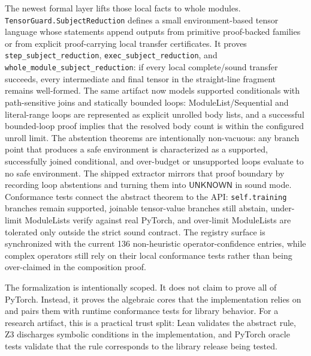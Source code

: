 \documentclass[11pt]{article}
\newcommand{\unknown}{\ensuremath{\mathsf{UNKNOWN}}}
\begin{document}
The newest formal layer lifts those local facts to whole modules.
\texttt{TensorGuard.SubjectReduction} defines a small environment-based tensor
language whose statements append outputs from primitive proof-backed families
or from explicit proof-carrying local transfer certificates.  It proves
\texttt{step\_subject\_reduction}, \texttt{exec\_subject\_reduction}, and
\texttt{whole\_module\_subject\_reduction}: if every local complete/sound
transfer succeeds, every intermediate and final tensor in the straight-line
fragment remains well-formed.  The same artifact now models supported
conditionals with path-sensitive joins and statically bounded loops:
ModuleList/Sequential and literal-range loops are represented as explicit
unrolled body lists, and a successful bounded-loop proof implies that the
resolved body count is within the configured unroll limit.  The abstention
theorems are intentionally non-vacuous: any branch point that produces a safe
environment is characterized as a supported, successfully joined conditional,
and over-budget or unsupported loops evaluate to no safe environment.  The
shipped extractor mirrors that proof boundary by recording loop abstentions and
turning them into \unknown{} in sound mode.  Conformance tests connect the
abstract theorem to the API: \texttt{self.training} branches remain supported,
joinable tensor-value branches still abstain, under-limit ModuleLists verify
against real PyTorch, and over-limit ModuleLists are tolerated only outside the
strict sound contract.  The registry surface is synchronized with the current
136 non-heuristic operator-confidence entries, while complex operators still
rely on their local conformance tests rather than being over-claimed in the
composition proof.

The formalization is intentionally scoped.  It does not claim to prove all of
PyTorch.  Instead, it proves the algebraic cores that the implementation relies
on and pairs them with runtime conformance tests for library behavior.  For a
research artifact, this is a practical trust split: Lean validates the abstract
rule, Z3 discharges symbolic conditions in the implementation, and PyTorch
oracle tests validate that the rule corresponds to the library release being
tested.
\end{document}
